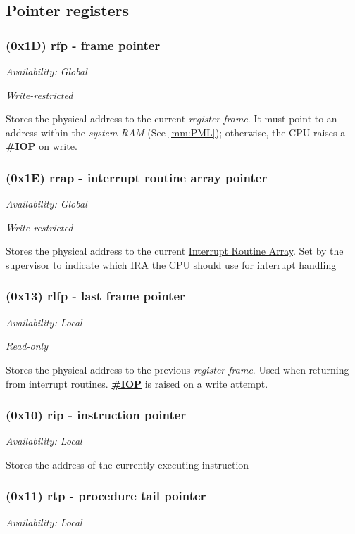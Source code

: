 \documentclass[a4paper,10pt]{article}
\begin{document}
\subsection{Pointer registers}
\subsubsection{(0x1D) rfp - frame pointer}
{\small \textit{Availability: Global}}

{\small \textit{Write-restricted}}

Stores the physical address to the current \emph{register frame}. It must point to an address within the \emph{system RAM} (See \ref{mm:PML}); otherwise, the CPU raises a \hyperref[ir:IOP]{\textbf{\#IOP}} on write.

\subsubsection{(0x1E) rrap - interrupt routine array pointer}
{\small \textit{Availability: Global}}

{\small \textit{Write-restricted}}

Stores the physical address to the current \hyperref[ir:ARRAY]{Interrupt Routine Array}. Set by the supervisor to indicate which IRA the CPU should use for interrupt handling

\subsubsection{(0x13) rlfp - last frame pointer}
{\small \textit{Availability: Local}}

{\small \textit{Read-only}}

Stores the physical address to the previous \emph{register frame}. Used when returning from interrupt routines. \hyperref[ir:IOP]{\textbf{\#IOP}} is raised on a write attempt.

\subsubsection{(0x10) rip - instruction pointer}
{\small \textit{Availability: Local}}

Stores the address of the currently executing instruction

\subsubsection{(0x11) rtp - procedure tail pointer}
{\small \textit{Availability: Local}}
\end{document}

